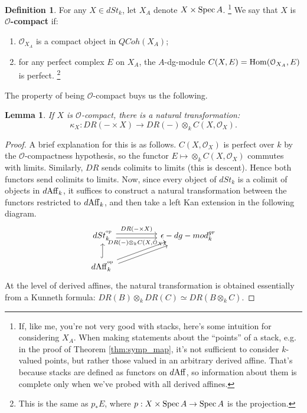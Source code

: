\documentclass[10pt,a4paper,reqno,oneside]{book} %
\theoremstyle{plain}
\newtheorem{lem}[thm]{Lemma}
\theoremstyle{definition}
\newtheorem{defin}[thm]{Definition}
\theoremstyle{remark}
\numberwithin{equation}{section}
\begin{document}
\begin{defin}
For any $X \in dSt_k$, let $X_A$ denote $X \times \operatorname{Spec} A$.
\footnote{If, like me, you're not very good with stacks, here's some intuition for considering $X_A$. When making statements
about the ``points'' of a stack, e.g. in the proof of Theorem \ref{thm:symp_map}, it's not sufficient to consider $k$-valued
points, but rather those valued in an arbitrary derived affine. That's because stacks are defined as functors on
$d\mathrm{Aff}$, so information about them is complete only when we've probed with all derived affines.} 
We say that $X$ is $\mathcal{O}$\textbf{-compact} if:
\begin{enumerate}
\item $\mathcal{O}_{X_A}$ is a compact object in $QCoh(X_A)$;
\item for any perfect complex $E$ on $X_A$, the $A$-dg-module $C(X,E) = \operatorname{Hom}(\mathcal{O}_{X_A},E)$ is perfect.
\footnote{This is the same as $p_* E$, where $p:X\times \operatorname{Spec} A \to \operatorname{Spec} A$ is the projection.}
\end{enumerate}
\end{defin}

The property of being $\mathcal{O}$-compact buys us the following.
\begin{lem}
If $X$ is $\mathcal{O}$-compact, there is a natural transformation:
\[	\kappa_X : DR( - \times X) \to DR(-) \otimes_k C(X,\mathcal{O}_X).	\]
\end{lem}
\begin{proof}
A brief explanation for this is as follows. $C(X,\mathcal{O}_X)$ is perfect over $k$ by the $\mathcal{O}$-compactness
hypothesis, so the functor $E \mapsto \otimes_k C(X,\mathcal{O}_X)$ commutes with limits. Similarly, $DR$ sends colimits
to limits (this is descent). Hence both functors send colimits to limits. Now, since every object of $dSt_k$ is a colimit
of objects in $d\mathrm{Aff}_k$, it suffices to construct a natural transformation between the functors restricted to $d\mathrm{Aff}_k$,
and then take a left Kan extension in the following diagram.
\[
\begin{tikzcd}
dSt_k^{\op} \arrow[shift left]{rr}{DR(-\times X)}\arrow[shift right,swap]{rr}{DR(-)\otimes_k C(X,\mathcal{O}_X)} 
& &\epsilon - dg-mod_k^{gr} \\
d\Aff_k^{\op}\arrow[hook]{u}\arrow[shift left]{urr}\arrow[shift right]{urr} & &
\end{tikzcd}
\]
At the level of derived affines, the natural transformation is obtained essentially from a Kunneth formula: 
$DR(B)\otimes_k DR(C) \simeq DR(B\otimes_k C)$.
\end{proof}
\end{document}
